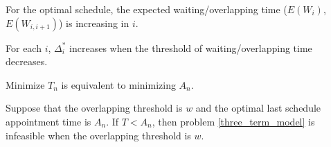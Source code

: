 \documentclass{article}
\newcommand{\Z}{\mathbf{Z}}
\newcommand{\D}{\bm{\Delta}}
\begin{document}
  
For the optimal schedule, the expected waiting/overlapping time ($E(W_{i})$, $E(W_{i,i+1})$) is increasing in $i$.
  
For each $i$, $\Delta_{i}^{*}$ increases when the threshold of waiting/overlapping time decreases.



Minimize $T_{n}$ is equivalent to minimizing $A_{n}$.

Suppose that the overlapping threshold is $w$ and the optimal last schedule appointment time is $A_{n}$. If $T < A_{n}$, then problem \eqref{three_term_model} is infeasible when the overlapping threshold is $w$.








\end{document}
